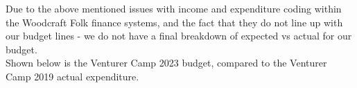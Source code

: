Due to the above mentioned issues with income and expenditure coding within the Woodcraft Folk finance systems, and the fact that they do not line up with our budget lines - we do not have a final breakdown of expected vs actual for our budget.\\

Shown below is the Venturer Camp 2023 budget, compared to the Venturer Camp 2019 actual expenditure. 


